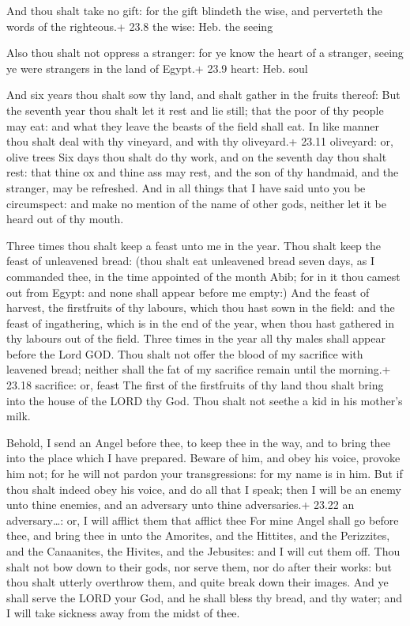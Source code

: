  And thou shalt take no gift: for the gift blindeth the
wise, and perverteth the words of the righteous.+ 23.8 the wise: Heb.
the seeing

 Also thou shalt not oppress a stranger: for ye know the
heart of a stranger, seeing ye were strangers in the land of Egypt.+
23.9 heart: Heb. soul

 And six years thou shalt sow thy land, and shalt gather in
the fruits thereof:  But the seventh year thou shalt let it
rest and lie still; that the poor of thy people may eat: and what they
leave the beasts of the field shall eat. In like manner thou shalt deal
with thy vineyard, and with thy oliveyard.+ 23.11 oliveyard: or, olive
trees  Six days thou shalt do thy work, and on the seventh
day thou shalt rest: that thine ox and thine ass may rest, and the son
of thy handmaid, and the stranger, may be refreshed.  And
in all things that I have said unto you be circumspect: and make no
mention of the name of other gods, neither let it be heard out of thy
mouth.

 Three times thou shalt keep a feast unto me in the year.
 Thou shalt keep the feast of unleavened bread: (thou shalt
eat unleavened bread seven days, as I commanded thee, in the time
appointed of the month Abib; for in it thou camest out from Egypt: and
none shall appear before me empty:)  And the feast of
harvest, the firstfruits of thy labours, which thou hast sown in the
field: and the feast of ingathering, which is in the end of the year,
when thou hast gathered in thy labours out of the field. 
Three times in the year all thy males shall appear before the Lord GOD.
 Thou shalt not offer the blood of my sacrifice with
leavened bread; neither shall the fat of my sacrifice remain until the
morning.+ 23.18 sacrifice: or, feast  The first of the
firstfruits of thy land thou shalt bring into the house of the LORD thy
God. Thou shalt not seethe a kid in his mother's milk.

 Behold, I send an Angel before thee, to keep thee in the
way, and to bring thee into the place which I have prepared.
 Beware of him, and obey his voice, provoke him not; for he
will not pardon your transgressions: for my name is in him.
 But if thou shalt indeed obey his voice, and do all that I
speak; then I will be an enemy unto thine enemies, and an adversary unto
thine adversaries.+ 23.22 an adversary\ldots: or, I will afflict them
that afflict thee  For mine Angel shall go before thee, and
bring thee in unto the Amorites, and the Hittites, and the Perizzites,
and the Canaanites, the Hivites, and the Jebusites: and I will cut them
off.  Thou shalt not bow down to their gods, nor serve
them, nor do after their works: but thou shalt utterly overthrow them,
and quite break down their images.  And ye shall serve the
LORD your God, and he shall bless thy bread, and thy water; and I will
take sickness away from the midst of thee.

